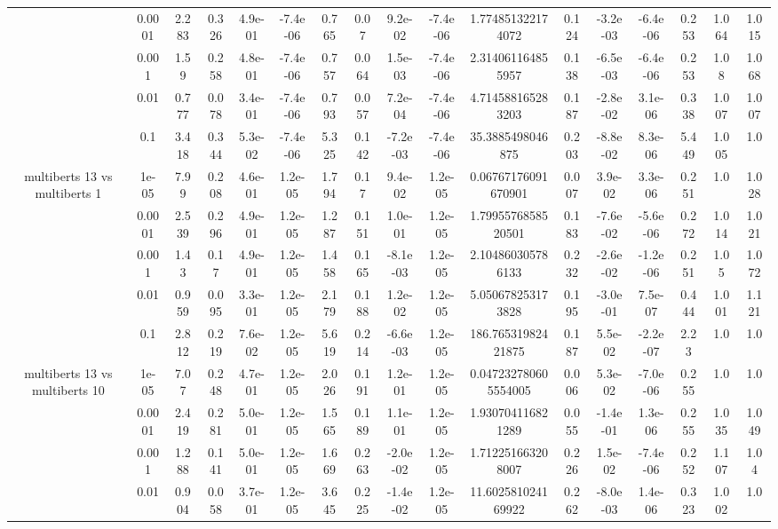 \begin{tabular}{|c|c|c|c|c|c|c|c|c|c|c|c|c|c|c|c|c|}
 & 0.0001 & 2.283 & 0.326 & 4.9e-01 & -7.4e-06 & 0.765 & 0.07 & 9.2e-02 & -7.4e-06 & 1.774851322174072 & 0.124 & -3.2e-03 & -6.4e-06 & 0.253 & 1.064 & 1.015 \\
 & 0.001 & 1.59 & 0.258 & 4.8e-01 & -7.4e-06 & 0.757 & 0.064 & 1.5e-03 & -7.4e-06 & 2.314061164855957 & 0.138 & -6.5e-03 & -6.4e-06 & 0.253 & 1.08 & 1.068 \\
 & 0.01 & 0.777 & 0.078 & 3.4e-01 & -7.4e-06 & 0.793 & 0.057 & 7.2e-04 & -7.4e-06 & 4.714588165283203 & 0.187 & -2.8e-02 & 3.1e-06 & 0.338 & 1.007 & 1.007 \\
 & 0.1 & 3.418 & 0.344 & 5.3e-02 & -7.4e-06 & 5.325 & 0.142 & -7.2e-03 & -7.4e-06 & 35.3885498046875 & 0.203 & -8.8e-02 & 8.3e-06 & 5.449 & 1.005 & 1.0 \\
\hline
\multirow{5}{*}{multiberts 13 vs multiberts 1} & 1e-05 & 7.99 & 0.208 & 4.6e-01 & 1.2e-05 & 1.794 & 0.17 & 9.4e-02 & 1.2e-05 & 0.06767176091670901 & 0.007 & 3.9e-02 & 3.3e-06 & 0.251 & 1.0 & 1.028 \\
 & 0.0001 & 2.539 & 0.296 & 4.9e-01 & 1.2e-05 & 1.287 & 0.151 & 1.0e-01 & 1.2e-05 & 1.7995576858520501 & 0.183 & -7.6e-02 & -5.6e-06 & 0.272 & 1.014 & 1.021 \\
 & 0.001 & 1.43 & 0.17 & 4.9e-01 & 1.2e-05 & 1.458 & 0.165 & -8.1e-03 & 1.2e-05 & 2.104860305786133 & 0.232 & -2.6e-02 & -1.2e-06 & 0.251 & 1.05 & 1.072 \\
 & 0.01 & 0.959 & 0.095 & 3.3e-01 & 1.2e-05 & 2.179 & 0.188 & 1.2e-02 & 1.2e-05 & 5.050678253173828 & 0.195 & -3.0e-01 & 7.5e-07 & 0.444 & 1.001 & 1.121 \\
 & 0.1 & 2.812 & 0.219 & 7.6e-02 & 1.2e-05 & 5.619 & 0.214 & -6.6e-03 & 1.2e-05 & 186.76531982421875 & 0.187 & 5.5e-02 & -2.2e-07 & 2.23 & 1.0 & 1.0 \\
\hline
\multirow{5}{*}{multiberts 13 vs multiberts 10} & 1e-05 & 7.07 & 0.248 & 4.7e-01 & 1.2e-05 & 2.026 & 0.191 & 1.2e-01 & 1.2e-05 & 0.047232780605554005 & 0.006 & 5.3e-02 & -7.0e-06 & 0.255 & 1.0 & 1.0 \\
 & 0.0001 & 2.419 & 0.281 & 5.0e-01 & 1.2e-05 & 1.565 & 0.189 & 1.1e-01 & 1.2e-05 & 1.930704116821289 & 0.055 & -1.4e-01 & 1.3e-06 & 0.255 & 1.035 & 1.049 \\
 & 0.001 & 1.288 & 0.141 & 5.0e-01 & 1.2e-05 & 1.669 & 0.263 & -2.0e-02 & 1.2e-05 & 1.712251663208007 & 0.226 & 1.5e-02 & -7.4e-06 & 0.252 & 1.107 & 1.04 \\
 & 0.01 & 0.904 & 0.058 & 3.7e-01 & 1.2e-05 & 3.645 & 0.225 & -1.4e-02 & 1.2e-05 & 11.602581024169922 & 0.262 & -8.0e-03 & 1.4e-06 & 0.323 & 1.002 & 1.0 \\

\end{tabular}
